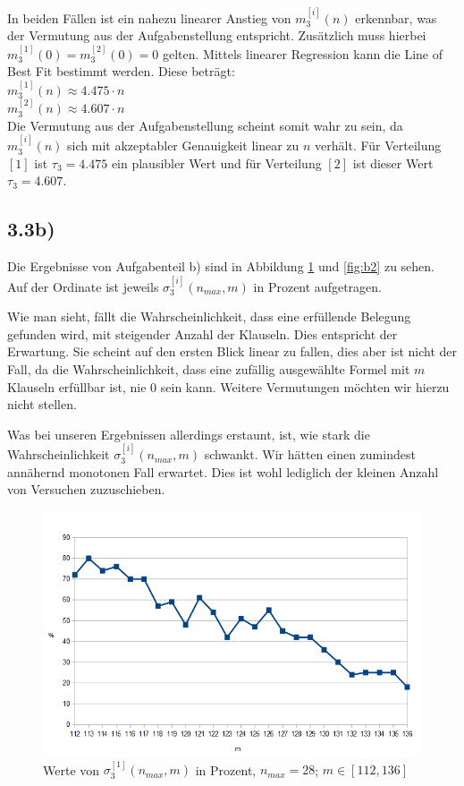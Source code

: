 \documentclass[maincolor=black]{exercise}
\begin{document}
In beiden Fällen ist ein nahezu linearer Anstieg von $m_3^{[i]}(n)$ erkennbar, was der Vermutung aus der Aufgabenstellung entspricht. Zusätzlich muss hierbei $m_3^{[1]}(0) = m_3^{[2]}(0) = 0$ gelten. Mittels linearer Regression kann die Line of Best Fit bestimmt werden. Diese beträgt:\\
$m_3^{[1]}(n) \approx 4.475\cdot n$\\
$m_3^{[2]}(n) \approx 4.607\cdot n$\\
Die Vermutung aus der Aufgabenstellung scheint somit wahr zu sein, da $m_3^{[i]}(n)$ sich mit akzeptabler Genauigkeit linear zu $n$ verhält. Für Verteilung $[1]$ ist $\tau_3 = 4.475$ ein plausibler Wert und für Verteilung $[2]$ ist dieser Wert $\tau_3 = 4.607$.

\subsection{3.3b)}
Die Ergebnisse von Aufgabenteil b) sind in Abbildung \ref{fig:b1} und \ref{fig:b2} zu sehen. Auf der Ordinate ist jeweils  $\sigma_3^{[i]}(n_{max},m)$ in Prozent aufgetragen.\par
Wie man sieht, fällt die Wahrscheinlichkeit, dass eine erfüllende Belegung gefunden wird, mit steigender Anzahl der Klauseln. Dies entspricht der Erwartung. Sie scheint auf den ersten Blick linear zu fallen, dies aber ist nicht der Fall, da die Wahrscheinlichkeit, dass eine zufällig ausgewählte Formel mit $m$ Klauseln erfüllbar ist, nie 0 sein kann. Weitere Vermutungen möchten wir hierzu nicht stellen.\par
Was bei unseren Ergebnissen allerdings erstaunt, ist, wie stark die Wahrscheinlichkeit $\sigma_3^{[i]}(n_{max},m)$ schwankt. Wir hätten einen zumindest annähernd monotonen Fall erwartet. Dies ist wohl lediglich der kleinen Anzahl von Versuchen zuzuschieben.
\begin{figure}[t]
	\includegraphics[width=\linewidth]{Diagram-A.png}
	\caption{Werte von $\sigma_3^{[1]}(n_{max},m)$ in Prozent, $n_{max} = 28$; $m \in [112,136]$\label{fig:b1}}
\end{figure}
\end{document}
